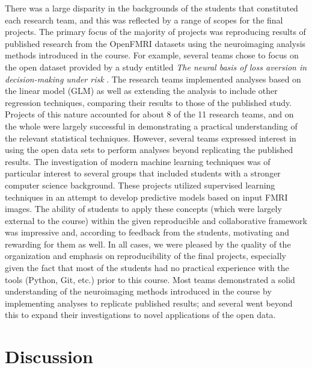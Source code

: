 There was a large disparity in the backgrounds of the students that constituted 
each research team, and this was reflected by a range of scopes for the
final projects.
The primary focus of the majority of projects was reproducing results
of published research from the OpenFMRI datasets using the neuroimaging 
analysis methods introduced in the course.
For example, several teams chose to focus on the open dataset provided by a
study entitled \textit{The neural basis of loss aversion in decision-making
under risk} \citep{tom2007neural}.
The research teams implemented analyses based on the linear model (GLM) as
well as extending the analysis to include other regression techniques, comparing
their results to those of the published study.
Projects of this nature accounted for about 8 of the 11 research teams, and
on the whole were largely successful in demonstrating a practical understanding
of the relevant statistical techniques.
However, several teams expressed interest in using the open data sets to 
perform analyses beyond replicating the published results.
The investigation of modern machine learning techniques was of particular 
interest to several groups that included students with a stronger computer
science background.
These projects utilized supervised learning techniques in an attempt to 
develop predictive models based on input FMRI images.
The ability of students to apply these concepts (which were largely external
to the course) within the given reproducible and collaborative 
framework was impressive and, according to feedback from the students,
motivating and rewarding for them as well.
In all cases, we were pleased by the quality of the organization and emphasis
on reproducibility of the final projects, especially given the fact that
most of the students had no practical experience with the tools (Python, Git,
etc.) prior to this course.
Most teams demonstrated a solid understanding of the neuroimaging methods introduced
in the course by implementing analyses to replicate published results; and 
several went beyond this to expand their investigations to novel applications
of the open data.


\section{Discussion}\label{discussion}

